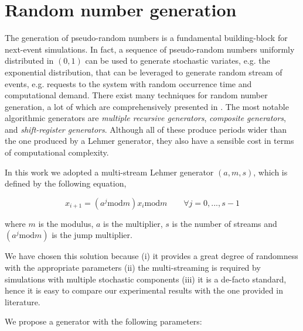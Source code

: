 \section{Random number generation}
\label{sec:random-number-generation}

The generation of pseudo-random numbers is a fundamental building-block for next-event simulations.
%
In fact, a sequence of pseudo-random numbers uniformly distributed in $(0,1)$ can be used to generate stochastic variates, e.g. the exponential distribution, that can be leveraged to generate random stream of events, e.g. requests to the system with random occurrence time and computational demand.
%
There exist many techniques for random number generation, a lot of which are comprehensively presented in \cite{l1994uniform}.
The most notable algorithmic generators are \textit{multiple recursive generators}, \textit{composite generators}, and \textit{shift-register generators}.
Although all of these produce periods wider than the one produced by a Lehmer generator, they also have a sensible cost in terms of computational complexity.

In this work we adopted a multi-stream Lehmer generator $(a,m,s)$, which is defined by the following equation,

\begin{equation}
\label{eqn:lehmer}
x_{i+1} = (a^{j} \mathrm{mod}m) x_{i} \mathrm{mod}m \qquad\forall j=0,...,s-1
\end{equation}

where $m$ is the modulus, $a$ is the multiplier, $s$ is the number of streams and $(a^{j} \mathrm{mod}m)$ is the jump multiplier.

We have chosen this solution because (i) it provides a great degree of randomness with the appropriate parameters (ii) the multi-streaming is required by simulations with multiple stochastic components (iii) it is a de-facto standard, hence it is easy to compare our experimental results with the one provided in literature.

We propose a generator with the following parameters:


